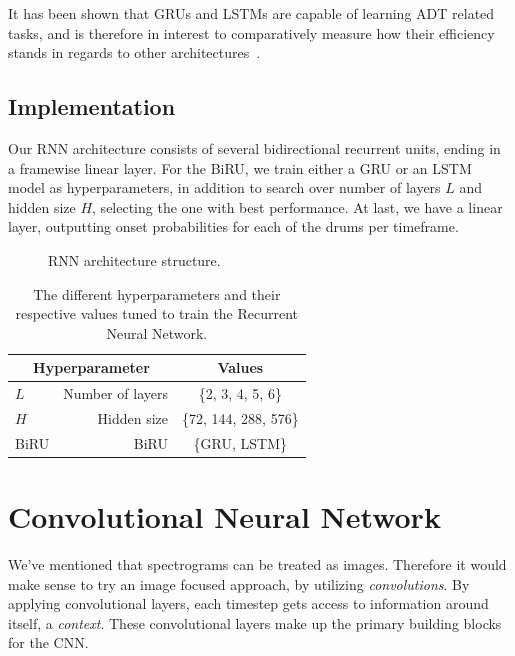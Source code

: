 It has been shown that \glspl{GRU} and \glspl{LSTM} are capable of learning \gls{ADT} related tasks, and is therefore in interest to comparatively measure how their efficiency stands in regards to other architectures~\cite{Southall2016AutomaticDT, vogl2016recurrent, Vogl2017DrumTV, signals4040042}.

\subsection{Implementation}

Our \gls{RNN} architecture consists of several bidirectional recurrent units, ending in a framewise linear layer. For the \gls{BiRU}, we train either a \gls{GRU} or an \gls{LSTM} model as hyperparameters, in addition to search over number of layers $L$ and hidden size $H$, selecting the one with best performance. At last, we have a linear layer, outputting onset probabilities for each of the drums per timeframe.

\begin{figure}[H]
    \centering
    
    \caption{RNN architecture structure.}
    \label{RNNFigure}
\end{figure}

\begin{table}[H]
    \centering
    \begin{tabular}{lr|c}
        \multicolumn{2}{c|}{Hyperparameter} & Values       \\
        \hline
        $L$ & Number of layers      & \{2, 3, 4, 5, 6\} \\
        $H$ & Hidden size      & \{72, 144, 288, 576\} \\
        \gls{BiRU} & \acrlong{BiRU} & \{\gls{GRU}, \gls{LSTM}\}\\
    \end{tabular}
    \caption{The different hyperparameters and their respective values tuned to train the Recurrent Neural Network.}
    \label{RNNHyperparams}
\end{table}

\section{Convolutional Neural Network}

We've mentioned that spectrograms can be treated as images. Therefore it would make sense to try an image focused approach, by utilizing \textit{convolutions}. By applying convolutional layers, each timestep gets access to information around itself, a \textit{context}. These convolutional layers make up the primary building blocks for the \gls{CNN}.


